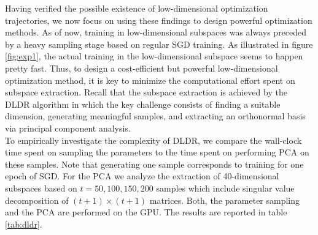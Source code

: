 \documentclass[11pt, a4paper]{article}
\begin{document}
Having verified the possible existence of low-dimensional optimization trajectories, we now focus on using these findings to design powerful optimization methods. As of now, training in low-dimensional subspaces was always preceded by a heavy sampling stage based on regular SGD training. As illustrated in figure \ref{fig:exp1}, the actual training in the low-dimensional subspace seems to happen pretty fast. Thus, to design a cost-efficient but powerful low-dimensional optimization method, it is key to minimize the computational effort spent on subspace extraction. Recall that the subspace extraction is achieved by the DLDR algorithm in which the key challenge consists of finding a suitable dimension, generating meaningful samples, and extracting an orthonormal basis via principal component analysis. \\

To empirically investigate the complexity of DLDR, we compare the wall-clock time spent on sampling the parameters to the time spent on performing PCA on these samples. Note that generating one sample corresponds to training for one epoch of SGD. For the PCA we analyze the extraction of 40-dimensional subspaces based on $t=50, 100, 150, 200$ samples which include singular value decomposition of $(t+1) \times (t+1)$ matrices. Both, the parameter sampling and the PCA are performed on the GPU. The results are reported in table \ref{tab:dldr}. \\
\end{document}
